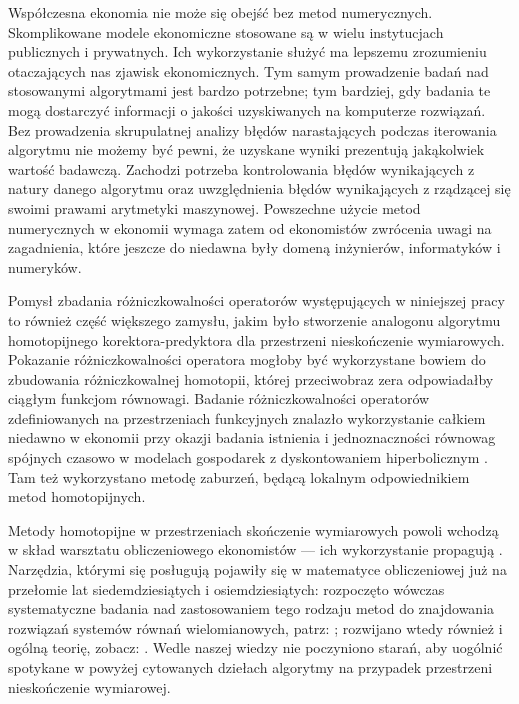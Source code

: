 	Współczesna ekonomia nie może się obejść bez metod numerycznych. Skomplikowane modele ekonomiczne stosowane są w wielu instytucjach publicznych i prywatnych. Ich wykorzystanie służyć ma lepszemu zrozumieniu otaczających nas zjawisk ekonomicznych. Tym samym prowadzenie badań nad stosowanymi algorytmami jest bardzo potrzebne; tym bardziej, gdy badania te mogą dostarczyć informacji o jakości uzyskiwanych na komputerze rozwiązań. Bez prowadzenia skrupulatnej analizy błędów narastających podczas iterowania algorytmu nie możemy być pewni, że uzyskane wyniki prezentują jakąkolwiek wartość badawczą. Zachodzi potrzeba kontrolowania błędów wynikających z natury danego algorytmu oraz uwzględnienia błędów wynikających z rządzącej się swoimi prawami arytmetyki maszynowej. Powszechne użycie metod numerycznych w ekonomii wymaga zatem od ekonomistów zwrócenia uwagi na zagadnienia, które jeszcze do niedawna były domeną inżynierów, informatyków i numeryków. 
	
	
	Pomysł zbadania różniczkowalności operatorów występujących w niniejszej pracy to również część większego zamysłu, jakim było stworzenie analogonu algorytmu homotopijnego korektora-predyktora dla przestrzeni nieskończenie wymiarowych. Pokazanie różniczkowalności operatora mogłoby być wykorzystane bowiem do zbudowania różniczkowalnej homotopii, której przeciwobraz zera odpowiadałby ciągłym funkcjom równowagi. Badanie różniczkowalności operatorów zdefiniowanych na przestrzeniach funkcyjnych znalazło wykorzystanie całkiem niedawno w ekonomii przy okazji badania istnienia i jednoznaczności równowag spójnych czasowo w modelach gospodarek z dyskontowaniem hiperbolicznym \citep[zobacz:][]{Judd_2003}. Tam też wykorzystano metodę zaburzeń, będącą lokalnym odpowiednikiem metod homotopijnych. 

	Metody homotopijne w przestrzeniach skończenie wymiarowych powoli wchodzą w skład warsztatu obliczeniowego ekonomistów --- ich wykorzystanie propagują \citet*{Doraszelski_2008, Herings_2009, Bajari_2010}. Narzędzia, którymi się posługują pojawiły się w matematyce obliczeniowej już na przełomie lat siedemdziesiątych i osiemdziesiątych: rozpoczęto wówczas systematyczne badania nad zastosowaniem tego rodzaju metod do znajdowania rozwiązań systemów równań wielomianowych, patrz: \citet{Garcia_1979, Garcia, Garcia_1980}; rozwijano wtedy również i ogólną teorię, zobacz: \citet{Heijer_1981}. Wedle naszej wiedzy nie poczyniono starań, aby uogólnić spotykane w powyżej cytowanych dziełach algorytmy na przypadek przestrzeni nieskończenie wymiarowej. 
	
